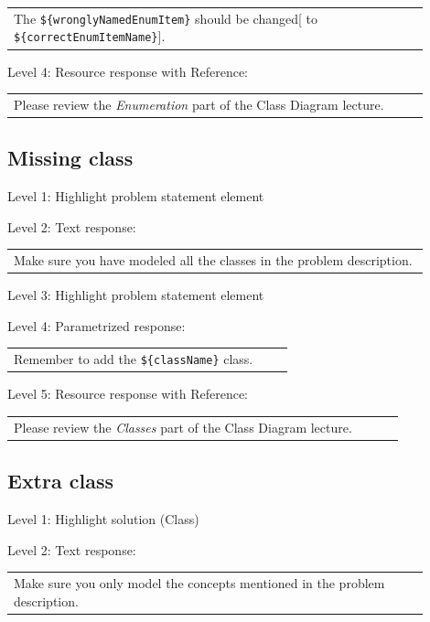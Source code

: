 \begin{tabular}{|p{0.9\linewidth}}
The \verb|${wronglyNamedEnumItem}| should be changed[ to \verb|${correctEnumItemName}|].
\end{tabular} \medskip

\noindent Level 4: Resource response with Reference: \medskip

\begin{tabular}{|p{0.9\linewidth}}
Please review the \textit{Enumeration} part of the Class Diagram lecture.
\end{tabular} \medskip


\subsection{Missing class}

\noindent Level 1: Highlight problem statement element \medskip

\noindent Level 2: Text response: \medskip

\begin{tabular}{|p{0.9\linewidth}}
Make sure you have modeled all the classes in the problem description.
\end{tabular} \medskip

\noindent Level 3: Highlight problem statement element \medskip

\noindent Level 4: Parametrized response: \medskip

\begin{tabular}{|p{0.9\linewidth}}
Remember to add the \verb|${className}| class.
\end{tabular} \medskip

\noindent Level 5: Resource response with Reference: \medskip

\begin{tabular}{|p{0.9\linewidth}}
Please review the \textit{Classes} part of the Class Diagram lecture.
\end{tabular} \medskip


\subsection{Extra class}

\noindent Level 1: Highlight solution (Class) \medskip

\noindent Level 2: Text response: \medskip

\begin{tabular}{|p{0.9\linewidth}}
Make sure you only model the concepts mentioned in the problem description.
\end{tabular} \medskip

